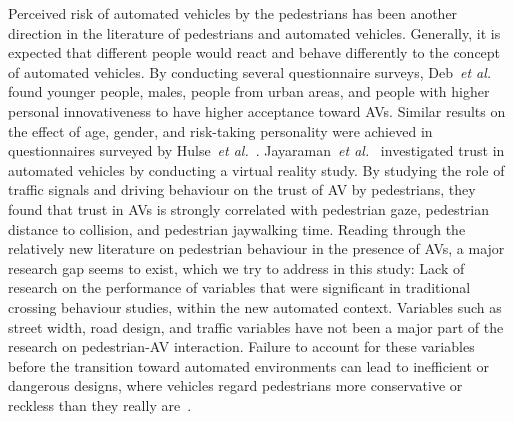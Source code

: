 Perceived risk of automated vehicles by the pedestrians has been another direction in the literature of pedestrians and automated vehicles. Generally, it is expected that different people would react and behave differently to the concept of automated vehicles. By conducting several questionnaire surveys, Deb~\textit{et al.}~\cite{deb2017pedestrians} found younger people, males, people from urban areas, and people with higher personal innovativeness to have higher acceptance toward AVs. Similar results on the effect of age, gender, and risk-taking personality were achieved in questionnaires surveyed by Hulse~\textit{et al.}~\cite{hulse2018perceptions}. Jayaraman~\textit{et al.}~\cite{jayaraman2019pedestrian} investigated trust in automated vehicles by conducting a virtual reality study. By studying the role of traffic signals and driving behaviour on the trust of AV by pedestrians, they found that trust in AVs is strongly correlated with pedestrian gaze, pedestrian distance to collision, and pedestrian jaywalking time. Reading through the relatively new literature on pedestrian behaviour in the presence of AVs, a major research gap seems to exist, which we try to address in this study: Lack of research on the performance of variables that were significant in traditional crossing behaviour studies, within the new automated context. Variables such as street width, road design, and traffic variables have not been a major part of the research on pedestrian-AV interaction.  Failure to account for these variables before the transition toward automated environments can lead to inefficient or dangerous designs, where vehicles regard pedestrians more conservative or reckless than they really are~\citep{rasouli2019autonomous}.

